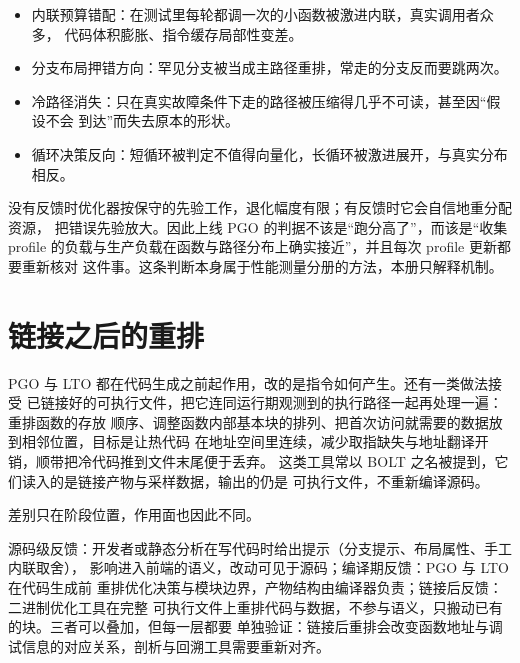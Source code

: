\documentclass[12pt,a4paper,fontset=fandol]{ctexbook}
\newcommand{\Mx}[1]{\textsf{#1}}
\begin{document}
\begin{itemize}
  \item 内联预算错配：在测试里每轮都调一次的小函数被激进内联，真实调用者众多，
        代码体积膨胀、指令缓存局部性变差。
  \item 分支布局押错方向：罕见分支被当成主路径重排，常走的分支反而要跳两次。
  \item 冷路径消失：只在真实故障条件下走的路径被压缩得几乎不可读，甚至因“假设不会
        到达”而失去原本的形状。
  \item 循环决策反向：短循环被判定不值得向量化，长循环被激进展开，与真实分布相反。
\end{itemize}

\begin{warning}[title={profile 失真比没有 profile 更糟}]
没有反馈时优化器按保守的先验工作，退化幅度有限；有反馈时它会自信地重分配资源，
把错误先验放大。因此上线 \Mx{PGO} 的判据不该是“跑分高了”，而该是“收集 \Mx{profile}
的负载与生产负载在函数与路径分布上确实接近”，并且每次 \Mx{profile} 更新都要重新核对
这件事。这条判断本身属于性能测量分册的方法，本册只解释机制。
\end{warning}

\section{链接之后的重排}\label{sec:cl05-postlink}

\Mx{PGO} 与 \Mx{LTO} 都在代码生成之前起作用，改的是指令如何产生。还有一类做法接受
已链接好的可执行文件，把它连同运行期观测到的执行路径一起再处理一遍：重排函数的存放
顺序、调整函数内部基本块的排列、把首次访问就需要的数据放到相邻位置，目标是让热代码
在地址空间里连续，减少取指缺失与地址翻译开销，顺带把冷代码推到文件末尾便于丢弃。
这类工具常以 \Mx{BOLT} 之名被提到，它们读入的是链接产物与采样数据，输出的仍是
可执行文件，不重新编译源码。

差别只在阶段位置，作用面也因此不同。

\begin{flow}[title={三种反馈回路的阶段位置}]
源码级反馈：开发者或静态分析在写代码时给出提示（分支提示、布局属性、手工内联取舍），
影响进入前端的语义，改动可见于源码；编译期反馈：\Mx{PGO} 与 \Mx{LTO} 在代码生成前
重排优化决策与模块边界，产物结构由编译器负责；链接后反馈：二进制优化工具在完整
可执行文件上重排代码与数据，不参与语义，只搬动已有的块。三者可以叠加，但每一层都要
单独验证：链接后重排会改变函数地址与调试信息的对应关系，剖析与回溯工具需要重新对齐。
\end{flow}
\end{document}
